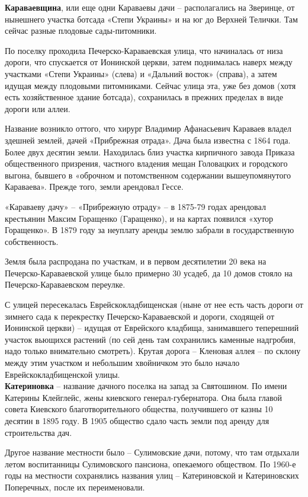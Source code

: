 \textbf{Караваевщина}, или еще одни Караваевы дачи – располагались на Зверинце, от нынешнего участка ботсада «Степи Украины» и на юг до Верхней Телички. Там сейчас разные плодовые сады-питомники. 

По поселку проходила Печерско-Караваевс\-кая улица, что начиналась от низа дороги, что спускается от Ионинской церкви, затем поднималась наверх между участками «Степи Украины» (слева) и «Дальний восток» (справа), а затем идущая между плодовыми питомниками. Сейчас улица эта, уже без домов (хотя есть хозяйственное здание ботсада), сохранилась в прежних пределах в виде дороги или аллеи.

Название возникло оттого, что хирург Владимир Афанасьевич Караваев владел здешней землей, дачей «Прибрежная отрада». Дача была известна с 1864 года. Более двух десятин земли. Находилась близ участка кирпичного завода Приказа общественного призрения, частного владения мещан Головацких и городского выгона, бывшего в «оброчном и потомственном содержании вышеупомянутого Караваева». Прежде того, земли арендовал Гессе.
 
«Караваеву дачу» – «Прибрежную отраду» – в 1875-79 годах арендовал крестьянин Максим Горащенко (Гаращенко), и на картах появился «хутор Горащенко». В 1879 году за неуплату аренды землю забрали в государственную собственность.

Земля была распродана по участкам, и в первом десятилетии 20 века на Печерско-Караваевской улице было примерно 30 усадеб, да 10 домов стояло на Печерско-Карава\-евском переулке.

С улицей пересекалась Еврейскокладбищенская (ныне от нее есть часть дороги от зимнего сада к перекрестку Печерско-Караваевской и дороги, сходящей от Ионинской церкви) – идущая от Еврейского кладбища, занимавшего теперешний участок вьющихся растений (по сей день там сохранились каменные надгробия, надо только внимательно смотреть). Крутая дорога – Кленовая аллея – по склону между этим участком и небольшим хвойничком это было начало Еврейскокладбищенской улицы.\\

\textbf{Катериновка} – название дачного поселка на запад за Святошином. По имени Катерины Клейглейс, жены киевского генерал-губерна\-тора. Она была главой совета Киевского благотворительного общества, получившего от казны 10 десятин в 1895 году. В 1905 общество сдало часть земли под аренду для строительства дач.

Другое название местности было – Сулимовские дачи, потому, что там отдыхали летом воспитанницы Сулимовского пансиона, опекаемого обществом. По 1960-е годы на местности сохранялись названия улиц – Катериновской и Катериновских Поперечных, после их переименовали. 

